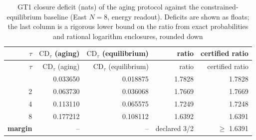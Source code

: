 \begin{longtable}{rrrrr}
\caption{GT1 closure deficit (nats) of the aging protocol against the constrained-equilibrium baseline (East $N=8$, energy readout). Deficits are shown as floats; the last column is a rigorous lower bound on the ratio from exact probabilities and rational logarithm enclosures, rounded down}\label{tab:gt1-margins} \\
\toprule
$\tau$ & $\mathrm{CD}_\tau$ (aging) & $\mathrm{CD}_\tau$ (equilibrium) & ratio & certified ratio \\
\midrule
\endfirsthead
\toprule
$\tau$ & $\mathrm{CD}_\tau$ (aging) & $\mathrm{CD}_\tau$ (equilibrium) & ratio & certified ratio \\
\midrule
\endhead
\bottomrule
\endfoot
1 & 0.033650 & 0.018875 & 1.7828 & 1.7828 \\
2 & 0.063730 & 0.036068 & 1.7669 & 1.7669 \\
4 & 0.113110 & 0.065575 & 1.7249 & 1.7248 \\
8 & 0.177212 & 0.108112 & 1.6392 & 1.6391 \\
\textbf{margin} & -- & -- & declared 3/2 & $\geq$ 1.6391 \\
\bottomrule
\end{longtable}
